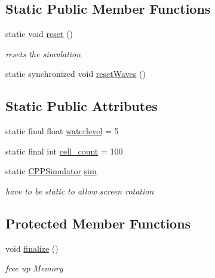 \subsection*{Static Public Member Functions}
\begin{DoxyCompactItemize}
\item 
static void \hyperlink{classSolver_1_1CPPSimulator_a4c41b88fe5dd55b674f70e9d88404dd0}{reset} ()
\begin{DoxyCompactList}\small\item\em resets the simulation \end{DoxyCompactList}\item 
static synchronized void \hyperlink{classSolver_1_1CPPSimulator_aca3dc86dc22d0dbba4e5ec825f1636cd}{reset\+Waves} ()
\end{DoxyCompactItemize}
\subsection*{Static Public Attributes}
\begin{DoxyCompactItemize}
\item 
static final float \hyperlink{classSolver_1_1CPPSimulator_a727cbbce369b51d9d14f329661a75a49}{waterlevel} = 5
\item 
static final int \hyperlink{classSolver_1_1CPPSimulator_a06273986348dfea50706c3e7d6f2e833}{cell\+\_\+count} = 100
\item 
static \hyperlink{classSolver_1_1CPPSimulator}{C\+P\+P\+Simulator} \hyperlink{classSolver_1_1CPPSimulator_a2e835ffd2fbcba1842ae5e3eeab73225}{sim}
\begin{DoxyCompactList}\small\item\em have to be static to allow screen rotation \end{DoxyCompactList}\end{DoxyCompactItemize}
\subsection*{Protected Member Functions}
\begin{DoxyCompactItemize}
\item 
void \hyperlink{classSolver_1_1CPPSimulator_a3f8c441cd1abe0151ff26f8075352fdc}{finalize} ()
\begin{DoxyCompactList}\small\item\em free up Memory \end{DoxyCompactList}\end{DoxyCompactItemize}


